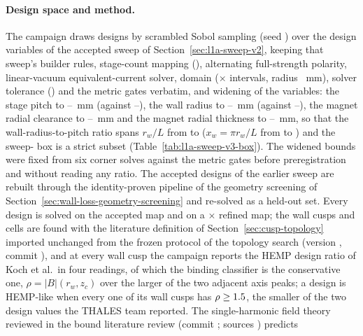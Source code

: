 \paragraph{Design space and method.}
The campaign draws \SwtSobolDesigns{} designs by scrambled Sobol sampling (seed
\SwtSeed) over the \SwtVariableCount{} design variables of the accepted sweep of
Section~\ref{sec:l1a-sweep-v2}, keeping that sweep's builder rules, stage-count
mapping (\SwtStageMapping), alternating full-strength polarity, linear-vacuum
\SwtFieldModelLevel{} equivalent-current solver, domain
(\SwtGridRadial$\times$\SwtGridAxial{} intervals, radius \SwtDomainRadiusMm{}~mm),
solver tolerance (\SwtSolverRelTol) and the \SwtVTwoGateCount{} metric gates
verbatim, and widening \SwtWidenedVariableCount{} of the variables: the stage pitch
to \SwtBoxPitchLoMm{}--\SwtBoxPitchHiMm{}~mm (against
\SwtVTwoBoxPitchLoMm{}--\SwtVTwoBoxPitchHiMm), the wall radius to
\SwtBoxRadiusLoMm{}--\SwtBoxRadiusHiMm{}~mm (against
\SwtVTwoBoxRadiusLoMm{}--\SwtVTwoBoxRadiusHiMm), the magnet radial clearance to
\SwtBoxClearanceLoMm{}--\SwtBoxClearanceHiMm{}~mm and the magnet radial thickness to
\SwtBoxThicknessLoMm{}--\SwtBoxThicknessHiMm{}~mm, so that the wall-radius-to-pitch
ratio spans $r_w/L$ from \SwtBoxRwOverLLo{} to \SwtBoxRwOverLHi{}
($x_w = \pi r_w/L$ from \SwtBoxXwLo{} to \SwtBoxXwHi) and the sweep-\SwtPriorVersion{}
box is a strict subset (Table~\ref{tab:l1a-sweep-v3-box}). The widened bounds were
fixed from six corner solves against the metric gates before preregistration and
without reading any ratio. The \SwtHeldOutDesigns{} accepted designs of the earlier
sweep are rebuilt through the identity-proven pipeline of the geometry screening of
Section~\ref{sec:wall-loss-geometry-screening} and re-solved as a held-out set. Every
design is solved on the accepted map and on a \SwtRefinement$\times$ refined map;
the wall cusps and cells are found with the literature definition of
Section~\ref{sec:cusp-topology} imported unchanged from the frozen protocol of the
topology search (version \SwtTopologyVersion, commit
\texttt{\SwtTopologyResultsCommit}), and at every wall cusp the campaign reports the
HEMP design ratio of Koch et al.\ in four readings, of which the binding classifier is
the conservative one, $\rho = |B|(r_w, z_c)$ over the larger of the two adjacent axis
peaks; a design is HEMP-like when every one of its wall cusps has
$\rho \ge 1.5$, the smaller of the two design values the THALES team
reported. The single-harmonic field theory reviewed in the bound literature review
(commit \texttt{\SwtLiteratureCommit}; sources \SwtLiteratureKeys) predicts

